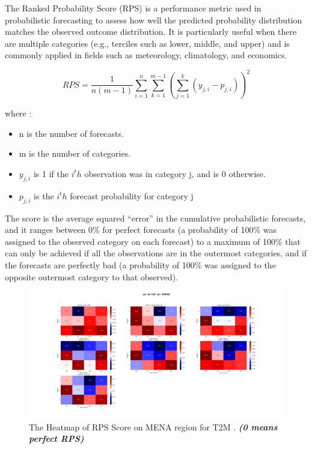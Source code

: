 The Ranked Probability Score (RPS) is a performance metric used in probabilistic forecasting to assess how well the predicted probability distribution matches the observed outcome distribution. It is particularly useful when there are multiple categories (e.g., terciles such as lower, middle, and upper) and is commonly applied in fields such as meteorology, climatology, and economics.

$$RPS=\frac{1}{n(m-1)}\sum\limits_{i=1}^{n} \sum\limits_{k=1}^{m-1} \left(\sum\limits_{j=1}^{k}(y_{j,i} - p_{j,i})\right)^2  $$

where : 

\begin{itemize}
	\item n is the number of forecasts.
	\item m is the number of categories.
	\item $y_{j,i}$ is 1 if the $i^th$ observation was in category j, and is 0 otherwise.
	\item $p_{j,i}$ is the $i^th$ forecast probability for category j
\end{itemize}

The score is the average squared “error” in the cumulative
probabilistic forecasts, and it ranges between 0\% for perfect forecasts (a probability of 100\%
was assigned to the observed category on each forecast) to a maximum of 100\% that can only
be achieved if all the observations are in the outermost categories, and if the forecasts are
perfectly bad (a probability of 100\% was assigned to the opposite outermost category to that
observed).


\begin{figure}[H]
    \centering
    \includegraphics[scale=0.25]{rps_T2M_ PERIOD.png}
    \caption{The Heatmap of  RPS Score on MENA region for T2M    . \textbf{\textit{(0 means perfect RPS)}}}
\end{figure}

